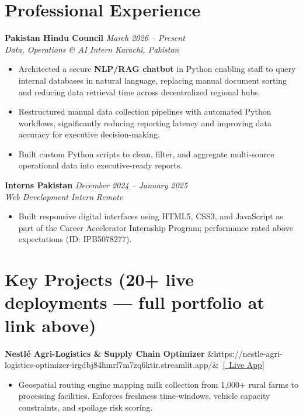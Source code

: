 \documentclass[10pt, a4paper]{article}
\newcommand{\job}[4]{%
  \textbf{#1} \hfill \textit{\small #3}\\[-2pt]
  \textit{\small\color{muted}#2} \hfill \textit{\small\color{muted}#4}
}
\newcommand{\proj}[3]{%
  \textbf{#1}%
  \ifx&#3&\else~\href{#3}{\small\textcolor{accent}{[\faExternalLinkAlt~#2]}}\fi
}
\begin{document}
\section{Professional Experience}

\job{Pakistan Hindu Council}{Data, Operations \& AI Intern}{March 2026 -- Present}{Karachi, Pakistan}
\begin{itemize}
  \item Architected a secure \textbf{NLP/RAG chatbot} in Python enabling staff to query internal databases in natural language, replacing manual document sorting and reducing data retrieval time across decentralized regional hubs.
  \item Restructured manual data collection pipelines with automated Python workflows, significantly reducing reporting latency and improving data accuracy for executive decision-making.
  \item Built custom Python scripts to clean, filter, and aggregate multi-source operational data into executive-ready reports.
\end{itemize}

\vspace{4pt}

\job{Interns Pakistan}{Web Development Intern}{December 2024 -- January 2025}{Remote}
\begin{itemize}
  \item Built responsive digital interfaces using HTML5, CSS3, and JavaScript as part of the Career Accelerator Internship Program; performance rated above expectations (ID: IPB5078277).
\end{itemize}

\section{Key Projects \textnormal{\small\color{muted}(20+ live deployments — full portfolio at link above)}}

\proj{Nestlé Agri-Logistics \& Supply Chain Optimizer}{Live App}{https://nestle-agri-logistics-optimizer-irgdbj84hmrf7m7zq6ktir.streamlit.app/}
\begin{itemize}
  \item Geospatial routing engine mapping milk collection from 1,000+ rural farms to processing facilities. Enforces freshness time-windows, vehicle capacity constraints, and spoilage risk scoring.
\end{itemize}
\end{document}
